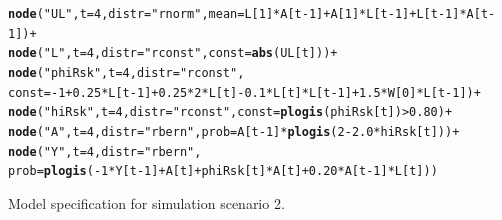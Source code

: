 \documentclass{article}\usepackage[]{graphicx}\usepackage[]{color}
\makeatletter
\newcommand{\hlnum}[1]{\textcolor[rgb]{0.686,0.059,0.569}{#1}}%
\newcommand{\hlstr}[1]{\textcolor[rgb]{0.192,0.494,0.8}{#1}}%
\newcommand{\hlopt}[1]{\textcolor[rgb]{0,0,0}{#1}}%
\newcommand{\hlstd}[1]{\textcolor[rgb]{0.345,0.345,0.345}{#1}}%
\newcommand{\hlkwc}[1]{\textcolor[rgb]{0.333,0.667,0.333}{#1}}%
\newcommand{\hlkwd}[1]{\textcolor[rgb]{0.737,0.353,0.396}{\textbf{#1}}}%
\newenvironment{kframe}{%
 \def\at@end@of@kframe{}%
 \ifinner\ifhmode%
  \def\at@end@of@kframe{\end{minipage}}%
  \begin{minipage}{\columnwidth}%
 \fi\fi%
 \def\FrameCommand##1{\hskip\@totalleftmargin \hskip-\fboxsep
 \colorbox{shadecolor}{##1}\hskip-\fboxsep
     \hskip-\linewidth \hskip-\@totalleftmargin \hskip\columnwidth}%
 \MakeFramed {\advance\hsize-\width
   \@totalleftmargin\z@ \linewidth\hsize
   \@setminipage}}%
 {\par\unskip\endMakeFramed%
 \at@end@of@kframe}
\newenvironment{knitrout}{}{} %
\makeatother
\begin{document}
\begin{knitrout}
\begin{kframe}
\begin{alltt}
    \hlkwd{node}\hlstd{(}\hlstr{"UL"}\hlstd{,}\hlkwc{t} \hlstd{=} \hlnum{4}\hlstd{,} \hlkwc{distr} \hlstd{=} \hlstr{"rnorm"}\hlstd{,} \hlkwc{mean} \hlstd{= L[}\hlnum{1}\hlstd{]} \hlopt{*} \hlstd{A[t}\hlopt{-}\hlnum{1}\hlstd{]} \hlopt{+} \hlstd{A[}\hlnum{1}\hlstd{]}\hlopt{*}\hlstd{L[t}\hlopt{-}\hlnum{1}\hlstd{]} \hlopt{+} \hlstd{L[t}\hlopt{-}\hlnum{1}\hlstd{]}\hlopt{*}\hlstd{A[t}\hlopt{-}\hlnum{1}\hlstd{])} \hlopt{+}
    \hlkwd{node}\hlstd{(}\hlstr{"L"}\hlstd{,} \hlkwc{t} \hlstd{=} \hlnum{4}\hlstd{,} \hlkwc{distr} \hlstd{=} \hlstr{"rconst"}\hlstd{,} \hlkwc{const} \hlstd{=} \hlkwd{abs}\hlstd{(UL[t]))} \hlopt{+}
    \hlkwd{node}\hlstd{(}\hlstr{"phiRsk"}\hlstd{,} \hlkwc{t} \hlstd{=} \hlnum{4}\hlstd{,} \hlkwc{distr} \hlstd{=} \hlstr{"rconst"}\hlstd{,}
      \hlkwc{const} \hlstd{=} \hlopt{-}\hlnum{1} \hlopt{+} \hlnum{0.25}\hlopt{*}\hlstd{L[t}\hlopt{-}\hlnum{1}\hlstd{]} \hlopt{+} \hlnum{0.25}\hlopt{*}\hlnum{2}\hlopt{*}\hlstd{L[t]} \hlopt{-} \hlnum{0.1}\hlopt{*}\hlstd{L[t]}\hlopt{*}\hlstd{L[t}\hlopt{-}\hlnum{1}\hlstd{]} \hlopt{+} \hlnum{1.5}\hlopt{*}\hlstd{W[}\hlnum{0}\hlstd{]}\hlopt{*}\hlstd{L[t}\hlopt{-}\hlnum{1}\hlstd{])} \hlopt{+}
    \hlkwd{node}\hlstd{(}\hlstr{"hiRsk"}\hlstd{,} \hlkwc{t} \hlstd{=} \hlnum{4}\hlstd{,} \hlkwc{distr} \hlstd{=} \hlstr{"rconst"}\hlstd{,} \hlkwc{const} \hlstd{=} \hlkwd{plogis}\hlstd{(phiRsk[t])} \hlopt{>} \hlnum{0.80}\hlstd{)} \hlopt{+}
    \hlkwd{node}\hlstd{(}\hlstr{"A"}\hlstd{,} \hlkwc{t} \hlstd{=} \hlnum{4}\hlstd{,} \hlkwc{distr} \hlstd{=} \hlstr{"rbern"}\hlstd{,} \hlkwc{prob} \hlstd{= A[t}\hlopt{-}\hlnum{1}\hlstd{]}\hlopt{*}\hlkwd{plogis}\hlstd{(}\hlnum{2} \hlopt{-} \hlnum{2.0}\hlopt{*}\hlstd{hiRsk[t]))} \hlopt{+}
    \hlkwd{node}\hlstd{(}\hlstr{"Y"}\hlstd{,} \hlkwc{t} \hlstd{=} \hlnum{4}\hlstd{,} \hlkwc{distr} \hlstd{=} \hlstr{"rbern"}\hlstd{,}
      \hlkwc{prob} \hlstd{=} \hlkwd{plogis}\hlstd{(}\hlopt{-}\hlnum{1}\hlopt{*}\hlstd{Y[t}\hlopt{-}\hlnum{1}\hlstd{]} \hlopt{+} \hlstd{A[t]} \hlopt{+} \hlstd{phiRsk[t]}\hlopt{*}\hlstd{A[t]} \hlopt{+} \hlnum{0.20}\hlopt{*}\hlstd{A[t}\hlopt{-}\hlnum{1}\hlstd{]}\hlopt{*}\hlstd{L[t]) )}
\end{alltt}
\end{kframe}
\end{knitrout}

\clearpage
Model specification for simulation scenario 2.
\end{document}
